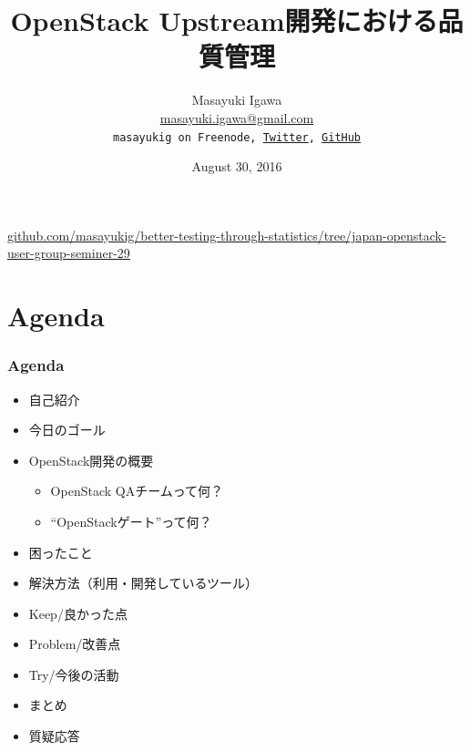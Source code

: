\documentclass[aspectratio=169,11pt,hyperref={colorlinks=true}]{beamer}
\author[Masayuki Igawa]{%
  \texorpdfstring{%
    \centering
    Masayuki Igawa\\
    \href{mailto:masayuki.igawa@gmail.com}{masayuki.igawa@gmail.com}\\
    \texttt{masayukig on Freenode,
     \href{https://twitter.com/masayukig}{Twitter},
     \href{https://github.com/masayukig}{GitHub}}
  }
  {Masayuki Igawa}
}
\date{August 30, 2016}
\title[OpenStack Upstream開発における品質管理
\hspace{2em}\insertframenumber/\inserttotalframenumber]{OpenStack Upstream開発における品質管理}
\begin{document}


{%
\begin{frame}[noframenumbering]
  \hypersetup{colorlinks,urlcolor=white}
  \titlepage{}
  \centering
  \href{https://github.com/masayukig/better-testing-through-statistics/tree/japan-openstack-user-group-seminer-29}{github.com/masayukig/better-testing-through-statistics/tree/japan-openstack-user-group-seminer-29}
\end{frame}
}

\section{Agenda}
\begin{frame}
  \frametitle{Agenda}
  \begin{itemize}
    \item 自己紹介
    \item 今日のゴール
    \item OpenStack開発の概要
    \begin{itemize}
      \item OpenStack QAチームって何？
      \item ``OpenStackゲート''って何？
    \end{itemize}
    \item 困ったこと
    \item 解決方法（利用・開発しているツール）
    \item Keep/良かった点
    \item Problem/改善点
    \item Try/今後の活動
    \item まとめ
    \item 質疑応答
  \end{itemize}
\end{frame}
\end{document}
